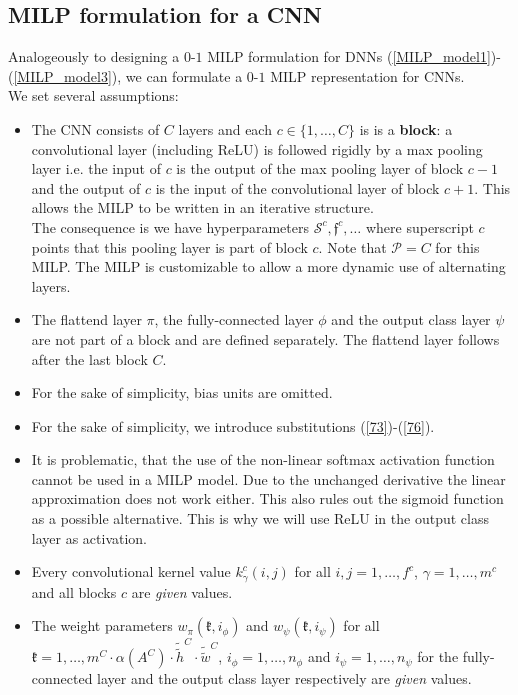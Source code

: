 \documentclass{article}
\begin{document}
\subsection{MILP formulation for a CNN}
\label{CNN_MILP_formulation}
Analogeously to designing a $0$-$1$ MILP formulation for DNNs (\ref{MILP_model1})-(\ref{MILP_model3}), we can formulate a $0$-$1$ MILP representation for CNNs.\\
We set several assumptions:
\begin{itemize}
\item The CNN consists of $C$ layers and each $c\in \{ 1, \ldots, C \}$ is is a \textbf{block}: a convolutional layer (including ReLU) is followed rigidly by a max pooling layer i.e. the input of $c$ is the output of the max pooling layer of block $c-1$ and the output of $c$ is the input of the convolutional layer of block $c+1$. This allows the MILP to be written in an iterative structure.\\
The consequence is we have hyperparameters $\mathcal{S}^c, \mathfrak{f}^c, \ldots$ where superscript $c$ points that this pooling layer is part of block $c$. Note that $\mathcal{P} = C$ for this MILP. The MILP is customizable to allow a more dynamic use of alternating layers.
\item The flattend layer $\pi$, the fully-connected layer $\phi$ and the output class layer $\psi$ are not part of a block and are defined separately. The flattend layer follows after the last block $C$.
\item For the sake of simplicity, bias units are omitted.
\item For the sake of simplicity, we introduce substitutions (\ref{73})-(\ref{76}).
\item It is problematic, that the use of the non-linear softmax activation function cannot be used in a MILP model. Due to the unchanged derivative the linear approximation does not work either. This also rules out the sigmoid function as a possible alternative. This is why we will use ReLU in the output class layer as activation.
\item Every convolutional kernel value $k_\gamma^c(i,j)$ for all $i,j=1,\ldots, f^c$, $\gamma=1, \ldots, m^c$ and all blocks $c$ are \textit{given} values.
\item The weight parameters $w_\pi(\mathfrak{k}, i_\phi)$ and $w_\psi(\mathfrak{k}, i_\psi)$ for all $\mathfrak{k}=1, \ldots, m^C \cdot \alpha(A^C) \cdot \tilde{\tilde{h}}^{C} \cdot \tilde{\tilde{w}}^{C}$, $i_\phi = 1, \ldots, n_\phi$ and $i_\psi = 1, \ldots, n_\psi$ for the fully-connected layer and the output class layer respectively are \textit{given} values.

\end{itemize}
\end{document}
